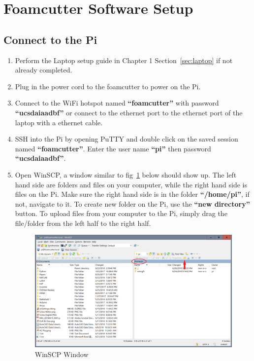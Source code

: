 \documentclass[titlepage,12pt,letter]{report}
\numberwithin{equation}{chapter}
\begin{document}
\section{Foamcutter Software Setup}
\subsection{Connect to the Pi}
\begin{enumerate}[noitemsep,topsep=0pt]
	\item Perform the Laptop setup guide in Chapter 1 Section~\ref{sec:laptop} if not already completed.
	\item Plug in the power cord to the foamcutter to power on the Pi.
	\item Connect to the WiFi hotspot named \textbf{``foamcutter''} with password \textbf{``ucsdaiaadbf''} or connect to the ethernet port to the ethernet port of the laptop with a ethernet cable.
	\item SSH into the Pi by opening PuTTY and double click on the saved session named \textbf{``foamcutter''}. Enter the user name \textbf{``pi''} then password \textbf{``ucsdaiaadbf''}.
	\item Open WinSCP, a window similar to fig~\ref{fig:winscp} below should show up. The left hand side are folders and files on your computer, while the right hand side is files on the Pi. Make sure the right hand side is in the folder \textbf{``/home/pi''}, if not, navigate to it. To create new folder on the Pi, use the \textbf{``new directory''} button. To upload files from your computer to the Pi, simply drag the file/folder from the left half to the right half. 
	\begin{figure} [H]
		\includegraphics[width = 0.9\linewidth]{./Figures/winscp.png}
		\caption{WinSCP Window}
		\label{fig:winscp}
	\end{figure}
\end{enumerate}
\end{document}
